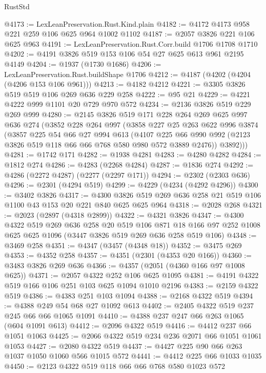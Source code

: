 \begin{lexlean}{RustStd}
\begin{coremodule}
{\begin{coremodule}
{{{{{{{{{{{{{@4173 := LexLeanPreservation.Rust.Kind.plain
@4182 := @4172 @4173 @958 @221 @259 @106 @625 @964 @1002 @1102
@4187 := @2057 @3826 @221 @106 @625 @963
@4191 := LexLeanPreservation.Rust.Corr.build @1706 @1708 @1710
@4202 := @4191 @3826 @519 @153 @106 @54 @27 @625 @613 @961 @2195 @4149
@4204 := @1937 (@1730 @1686)
@4206 := LexLeanPreservation.Rust.buildShape @1706
@4212 := @4187 (@4202 (@4204 (@4206 @153 @106 @961)))
@4213 := @4182 @4212
@4221 := @3305 @3826 @519 @519 @106 @269 @636 @229 @258
@4222 := @95 @21
@4229 := @4221 @4222 @999 @1101 @20 @729 @970 @572
@4234 := @2136 @3826 @519 @229 @269 @999
@4280 := @2145
    @3826
    @519
    @171
    @228
    @264
    @269
    @625
    @997
    @636
    @274
    (@3852
      @228
      @264
      @997
      (@3858
        @227
        @25
        @263
        @622
        @996
        @3874
        (@3857
          @225
          @54
          @66
          @27
          @994
          @613
          (@4107 @225 @66 @990 @992 (@2123 @3826 @519 @118 @66 @66 @768 @580 @980 @572 @3889 @2476))
          @3892)))
@4281 := @1742 @171
@4282 := @1938 @4281
@4283 := @4280 @4282
@4284 := @1812 @274
@4286 := @4283 (@2268 @4284)
@4287 := @1836 @274
@4292 := @4286 (@2272 @4287) (@2277 (@2297 @171))
@4294 := @2302 (@2303 @636)
@4296 := @2301 (@4294 @519)
@4299 := @4229 (@4234 (@4292 @4296))
@4300 := @3402 @3826
@4317 := @4300 @3826 @519 @269 @636 @258 @21 @519 @106 @1100 @43 @153 @20 @221 @840 @625 @625 @964
@4318 := @2028 @268
@4321 := @2023 (@2897 (@4318 @2899))
@4322 := @4321 @3826
@4347 := @4300
    @4322
    @519
    @269
    @636
    @258
    @20
    @519
    @106
    @871
    @18
    @166
    @97
    @252
    @1008
    @625
    @625
    @1096
    (@3447 @3826 @519 @269 @636 @258 @519 @106)
@4348 := @3469 @258
@4351 := @4347 (@3457 (@4348 @18))
@4352 := @3475 @269
@4353 := @4352 @258
@4357 := @4351 (@2301 (@4353 @20 @166))
@4360 := @3483 @3826 @269 @636
@4366 := @4357 (@2051 (@4360 @166 @97 @1008 @625))
@4371 := @2057 @4322 @252 @106 @625 @1095
@4381 := @4191 @4322 @519 @166 @106 @251 @103 @625 @1094 @1010 @2196
@4383 := @2159 @4322 @519
@4386 := @4383 @251 @103 @1094
@4388 := @2168 @4322 @519
@4394 := @4388 @249 @54 @68 @27 @1092 @613
@4402 := @2405 @4322 @519 @237 @245 @66 @66 @1065 @1091
@4410 := @4388 @237 @247 @66 @263 @1065 (@604 @1091 @613)
@4412 := @2096 @4322 @519
@4416 := @4412 @237 @66 @1051 @1063
@4425 := @2066 @4322 @519 @234 @236 @2071 @66 @1051 @1061 @1053
@4427 := @2080 @4322 @519
@4437 := @4427 @225 @90 @66 @263 @1037 @1050 @1060 @566 @1015 @572
@4441 := @4412 @225 @66 @1033 @1035
@4450 := @2123 @4322 @519 @118 @66 @66 @768 @580 @1023 @572
}}}}}}}}}}}}}
\end{coremodule}}
\end{coremodule}
\end{lexlean}
